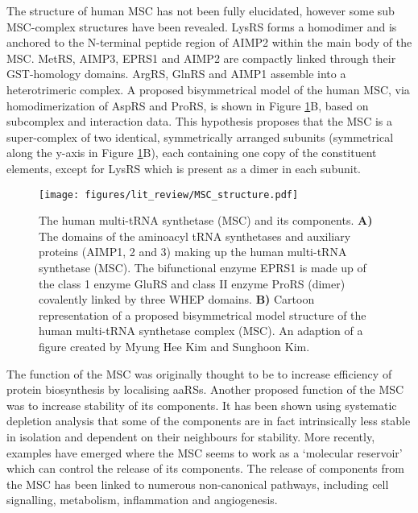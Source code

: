 The structure of human MSC has not been fully elucidated, however some sub MSC-complex structures have been revealed.
LysRS forms a homodimer and is anchored to the N-terminal peptide region of AIMP2 within the main body of the MSC.
MetRS, AIMP3, EPRS1 and AIMP2 are compactly linked through their GST-homology domains.
ArgRS, GlnRS and AIMP1 assemble into a heterotrimeric complex\cite{kim2019evolution, khan20203, kim2020structures}.
A proposed bisymmetrical model of the human MSC, via homodimerization of AspRS and ProRS, is shown in Figure \ref{fig:MSC}B, based on subcomplex and interaction data\cite{cho2015assembly, kaminska2009dissection, mirande2017aminoacyl}.
This hypothesis proposes that the MSC is a super-complex of two identical, symmetrically arranged subunits (symmetrical along the y-axis in Figure \ref{fig:MSC}B), each containing one copy of the constituent elements, except for LysRS which is present as a dimer in each subunit.

\begin{figure}[htb]
\centering
\texttt{[image: figures/lit\_review/MSC\_structure.pdf]}
\caption[Multi-tRNA synthetase structure]{The human multi-tRNA synthetase (MSC) and its components.
\textbf{A)} The domains of the aminoacyl tRNA synthetases and auxiliary proteins (AIMP1, 2 and 3) making up the human multi-tRNA synthetase (MSC).
The bifunctional enzyme EPRS1 is made up of the class 1 enzyme GluRS and class II enzyme ProRS (dimer) covalently linked by three WHEP domains.
\textbf{B)} Cartoon representation of a proposed bisymmetrical model structure of the human multi-tRNA synthetase complex (MSC).
An adaption of a figure created by Myung Hee Kim and Sunghoon Kim\cite{kim2020structures}.
}
\label{fig:MSC}\end{figure}

The function of the MSC was originally thought to be to increase efficiency of protein biosynthesis by localising aaRSs.
Another proposed function of the MSC was to increase stability of its components.
It has been shown using systematic depletion analysis that some of the components are in fact intrinsically less stable in isolation and dependent on their neighbours for stability\cite{han2006hierarchical}.
More recently, examples have emerged where the MSC seems to work as a `molecular reservoir' which can control the release of its components.
The release of components from the MSC has been linked to numerous non-canonical pathways, including cell signalling, metabolism, inflammation and angiogenesis.


